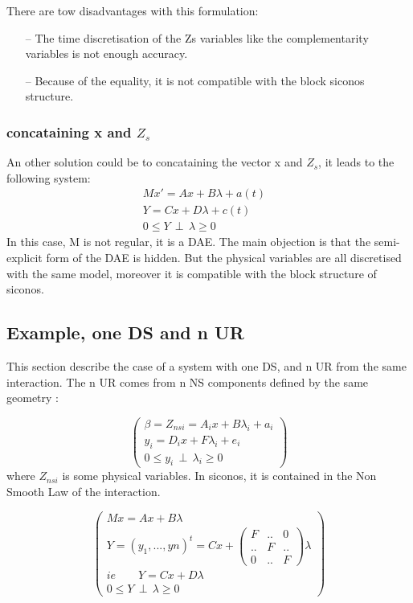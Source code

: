 There are tow disadvantages with this formulation:
\begin{itemize}
 \item[--] The time discretisation of the Zs variables like the complementarity variables is not
enough accuracy.
 \item[--] Because of the equality, it is not compatible with the block siconos structure.
\end{itemize}
\subsubsection{concataining x and $Z_{s}$ }
An other solution could be to concataining the vector x and $Z_{s}$, it leads to the following
system:
 \begin{eqnarray}
Mx'=Ax +B \lambda +a(t)&\label{eq_merge2_1}\\
Y=Cx+D\lambda + c(t) &\label{eq_merge2_3}\\
0 \leq Y \, \perp \, \lambda \geq 0&\label{eq_merge2_eqperp}
\end{eqnarray}
In this case, M is not regular, it is a DAE. The main objection is that the semi-explicit form of
the DAE is hidden. But the physical variables are all discretised with the same model, moreover it
is compatible with the block structure of siconos.

\subsection{Example, one DS and n UR}

This section describe the case of a system with one DS, and n UR from the same interaction. The n UR
comes from n NS components defined by the same geometry :

\begin{equation}\left(\begin{array}{c}
\beta = Z_{nsi} = A_{i}x+B\lambda_{i} + a_{i}\\
y_{i}=D_{i}x+F\lambda_{i}+e_{i}\\
0 \leq y_{i} \, \perp \, \lambda_{i} \geq 0
\end{array}\right)
\end{equation}
where $Z_{nsi}$ is some physical variables. In siconos, it is contained in the Non Smooth Law of the
interaction.

\begin{equation}\left(\begin{array}{c}
Mx = Ax + B \lambda\\
Y=(y_{1},...,y{n})^{t}=Cx + \left(\begin{array}{ccc} F & .. & 0\\ ..& F & ..\\0 & .. &
F\end{array}\right) \lambda\\
ie \qquad Y=Cx+D\lambda\\
0 \leq Y \, \perp \, \lambda \geq 0
\end{array}\right)
\end{equation}



